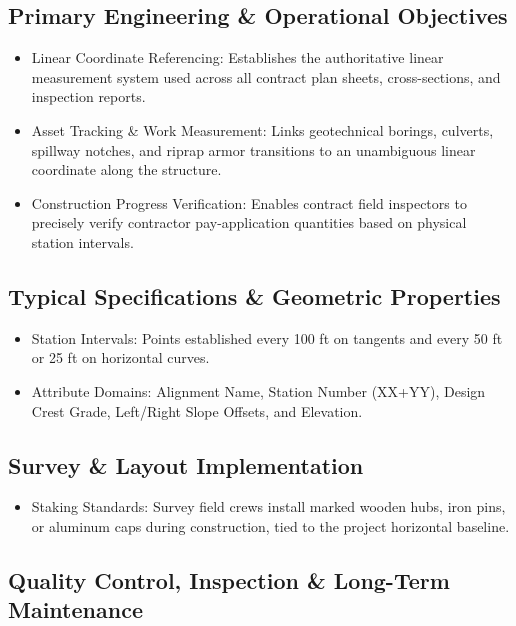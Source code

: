 \documentclass[
  letterpaper,
  DIV=11,
  numbers=noendperiod]{scrreprt}
\providecommand{\tightlist}{%
  \setlength{\itemsep}{0pt}\setlength{\parskip}{0pt}}
\begin{document}
\subsection{Primary Engineering \& Operational
Objectives}\label{primary-engineering-operational-objectives-3}

\begin{itemize}
\item
  Linear Coordinate Referencing: Establishes the authoritative linear
  measurement system used across all contract plan sheets,
  cross-sections, and inspection reports.
\item
  Asset Tracking \& Work Measurement: Links geotechnical borings,
  culverts, spillway notches, and riprap armor transitions to an
  unambiguous linear coordinate along the structure.
\item
  Construction Progress Verification: Enables contract field inspectors
  to precisely verify contractor pay-application quantities based on
  physical station intervals.
\end{itemize}

\subsection{Typical Specifications \& Geometric
Properties}\label{typical-specifications-geometric-properties-2}

\begin{itemize}
\item
  Station Intervals: Points established every 100 ft on tangents and
  every 50 ft or 25 ft on horizontal curves.
\item
  Attribute Domains: Alignment Name, Station Number (XX+YY), Design
  Crest Grade, Left/Right Slope Offsets, and Elevation.
\end{itemize}

\subsection{Survey \& Layout
Implementation}\label{survey-layout-implementation}

\begin{itemize}
\tightlist
\item
  Staking Standards: Survey field crews install marked wooden hubs, iron
  pins, or aluminum caps during construction, tied to the project
  horizontal baseline.
\end{itemize}

\subsection{Quality Control, Inspection \& Long-Term
Maintenance}\label{quality-control-inspection-long-term-maintenance-20}
\end{document}
